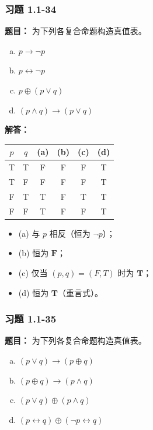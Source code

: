 \documentclass[11pt,UTF8]{article}
\begin{document}
\subsubsection*{习题 1.1-34}
\textbf{题目：} 为下列各复合命题构造真值表。
\begin{enumerate}[a)]
    \item $p \to \neg p$
    \item $p \leftrightarrow \neg p$
    \item $p \oplus (p \lor q)$
    \item $(p \land q) \to (p \lor q)$
\end{enumerate}

\textbf{解答：}
\begin{center}
\begin{tabular}{cc|cccc}
\hline
$p$ & $q$ & (a) & (b) & (c) & (d) \\
\hline
T & T & F & F & F & T \\
T & F & F & F & F & T \\
F & T & T & F & T & T \\
F & F & T & F & F & T \\
\hline
\end{tabular}
\end{center}
\begin{itemize}
    \item (a) 与 $p$ 相反（恒为 $\neg p$）；
    \item (b) 恒为 $\mathbf{F}$；
    \item (c) 仅当 $(p,q)=(F,T)$ 时为 $\mathbf{T}$；
    \item (d) 恒为 $\mathbf{T}$（重言式）。
\end{itemize}

\subsubsection*{习题 1.1-35}
\textbf{题目：} 为下列各复合命题构造真值表。
\begin{enumerate}[a)]
    \item $(p \lor q) \to (p \oplus q)$
    \item $(p \oplus q) \to (p \land q)$
    \item $(p \lor q) \oplus (p \land q)$
    \item $(p \leftrightarrow q) \oplus (\neg p \leftrightarrow q)$
\end{enumerate}
\end{document}
